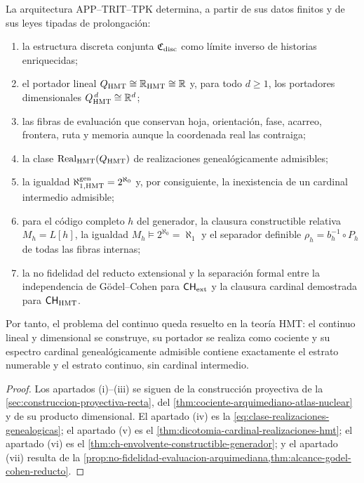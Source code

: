 \begin{theorem}
\label{thm:resolucion-genealogica-continuo}
La arquitectura APP--TRIT--TPK determina, a partir de sus datos finitos y de
sus leyes tipadas de prolongaci\'on:
\begin{enumerate}[label=\textup{(\roman*)}]
 \item la estructura discreta conjunta
 \(\mathfrak C_{\rm disc}\) como l\'imite inverso de historias enriquecidas;
 \item el portador lineal
 \(Q_{\rm HMT}\cong\mathbb R_{\rm HMT}\cong\mathbb R\) y, para todo
 \(d\geq1\), los portadores dimensionales
 \(Q_{\rm HMT}^{\,d}\cong\mathbb R^d\);
 \item las fibras de evaluaci\'on que conservan hoja, orientaci\'on, fase,
 acarreo, frontera, ruta y memoria aunque la coordenada real las contraiga;
 \item la clase \(\operatorname{Real}_{\rm HMT}(Q_{\rm HMT})\) de
 realizaciones geneal\'ogicamente admisibles;
 \item la igualdad
 \(\aleph_{1,\rm HMT}^{\rm gen}=2^{\aleph_0}\) y, por consiguiente, la
 inexistencia de un cardinal intermedio admisible;
 \item para el código completo \(h\) del generador, la clausura
 constructible relativa \(M_h=L[h]\), la igualdad
 \(M_h\models2^{\aleph_0}=\aleph_1\) y el separador definible
 \(\rho_h=b_h^{-1}\circ P_h\) de todas las fibras internas;
 \item la no fidelidad del reducto extensional y la separaci\'on formal entre
 la independencia de G\"odel--Cohen para \(\mathsf{CH}_{\rm ext}\) y la
 clausura cardinal demostrada para \(\mathsf{CH}_{\rm HMT}\).
\end{enumerate}
Por tanto, el problema del continuo queda resuelto en la teor\'ia HMT: el
continuo lineal y dimensional se construye, su portador se realiza como
cociente y su espectro cardinal geneal\'ogicamente admisible contiene
exactamente el estrato numerable y el estrato continuo, sin cardinal
intermedio.
\end{theorem}

\begin{proof}
Los apartados \textup{(i)}--\textup{(iii)} se siguen de la construcci\'on
proyectiva de la \cref{sec:construccion-proyectiva-recta}, del
\cref{thm:cociente-arquimediano-atlas-nuclear} y de su producto dimensional.
El apartado \textup{(iv)} es la
\cref{eq:clase-realizaciones-genealogicas}; el apartado \textup{(v)} es el
\cref{thm:dicotomia-cardinal-realizaciones-hmt}; el apartado \textup{(vi)}
es el \cref{thm:ch-envolvente-constructible-generador}; y el apartado
\textup{(vii)} resulta de la
\cref{prop:no-fidelidad-evaluacion-arquimediana,thm:alcance-godel-cohen-reducto}.
\end{proof}
